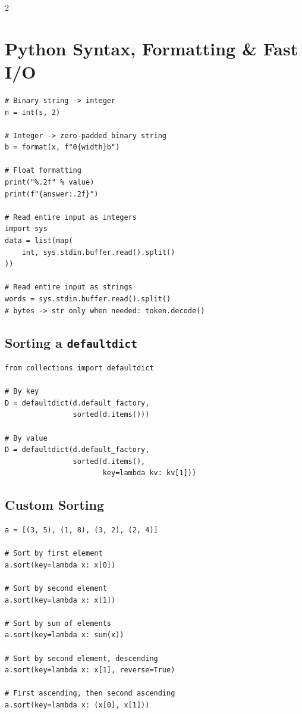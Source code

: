 \documentclass[9pt,a4paper]{extarticle}
\begin{document}
\begin{multicols}{2}

\section{Python Syntax, Formatting \& Fast I/O}

\begin{lstlisting}
# Binary string -> integer
n = int(s, 2)

# Integer -> zero-padded binary string
b = format(x, f"0{width}b")

# Float formatting
print("%.2f" % value)
print(f"{answer:.2f}")

# Read entire input as integers
import sys
data = list(map(
    int, sys.stdin.buffer.read().split()
))

# Read entire input as strings
words = sys.stdin.buffer.read().split()
# bytes -> str only when needed: token.decode()
\end{lstlisting}

\subsection{Sorting a \texttt{defaultdict}}
\begin{lstlisting}
from collections import defaultdict

# By key
D = defaultdict(d.default_factory,
                sorted(d.items()))

# By value
D = defaultdict(d.default_factory,
                sorted(d.items(),
                       key=lambda kv: kv[1]))
\end{lstlisting}


\subsection{Custom Sorting}
\begin{lstlisting}
a = [(3, 5), (1, 8), (3, 2), (2, 4)]

# Sort by first element
a.sort(key=lambda x: x[0])

# Sort by second element
a.sort(key=lambda x: x[1])

# Sort by sum of elements
a.sort(key=lambda x: sum(x))

# Sort by second element, descending
a.sort(key=lambda x: x[1], reverse=True)

# First ascending, then second ascending
a.sort(key=lambda x: (x[0], x[1]))


\end{lstlisting}
\end{multicols}
\end{document}
